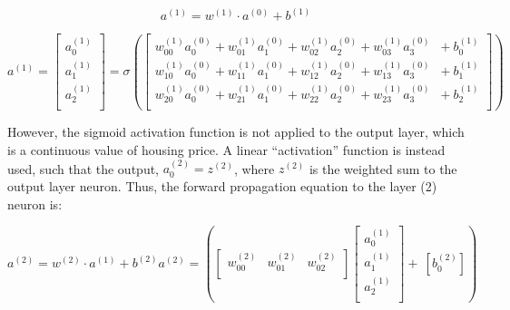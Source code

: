 \documentclass[12pt,a4paper]{article}
\begin{document}
\begin{equation}
a^{\left(1\right)}= w^{(1)} \cdot a^{(0)}+b^{(1)}
\end{equation}


\begin{equation}
a^{\left(1\right)}=\left[\begin{matrix}a_0^{\left(1\right)}\\a_1^{\left(1\right)}\\a_2^{\left(1\right)}\\\end{matrix}\right] = \sigma\left(\left[\begin{matrix}w_{00}^{\left(1\right)}a_0^{\left(0\right)}+w_{01}^{\left(1\right)}a_1^{\left(0\right)}+w_{02}^{\left(1\right)}a_2^{\left(0\right)}+w_{03}^{\left(1\right)}a_3^{\left(0\right)}\\w_{10}^{\left(1\right)}a_0^{\left(0\right)}+w_{11}^{\left(1\right)}a_1^{\left(0\right)}+w_{12}^{\left(1\right)}a_2^{\left(0\right)}+w_{13}^{\left(1\right)}a_3^{\left(0\right)}\\w_{20}^{\left(1\right)}a_0^{\left(0\right)}+w_{21}^{\left(1\right)}a_1^{\left(0\right)}+w_{22}^{\left(1\right)}a_2^{\left(0\right)}+w_{23}^{\left(1\right)}a_3^{\left(0\right)}\\\end{matrix}\begin{matrix}{+\ b}_0^{\left(1\right)}\\+\ b_1^{\left(1\right)}\\+\ b_2^{\left(1\right)}\\\end{matrix}\right]\right)
\end{equation}



However, the sigmoid activation function is not applied to the output layer, which is a continuous value of housing price. A linear “activation” function is instead used, such that the output, $a_0^{\left(2\right)}=z^{\left(2\right)}$, where $z^{\left(2\right)}$ is the weighted sum to the output layer neuron. Thus, the forward propagation equation to the layer (2) neuron is:

\begin{equation}
a^{\left(2\right)}=w^{(2)} \cdot a^{(1)}+b^{(2)}
a^{(2)} = \left(\left[\begin{matrix}w_{00}^{\left(2\right)}&w_{01}^{\left(2\right)}&w_{02}^{\left(2\right)}\\\end{matrix}\right]\left[\begin{matrix}a_0^{\left(1\right)}\\a_1^{\left(1\right)}\\a_2^{\left(1\right)}\\\end{matrix}\right]+\ \left[b_0^{\left(2\right)}\right]\right)
\end{equation}
\end{document}
